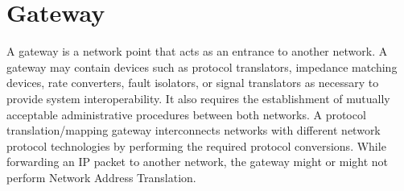\section{Gateway}
A gateway is a network point that acts as an entrance to another network.
A gateway may contain devices such as protocol translators, impedance matching devices, rate converters, fault isolators, or signal translators as necessary to provide system interoperability. 
It also requires the establishment of mutually acceptable administrative procedures between both networks.
A protocol translation/mapping gateway interconnects networks with different network protocol technologies by performing the required protocol conversions.
While forwarding an IP packet to another network, the gateway might or might not perform Network Address Translation.